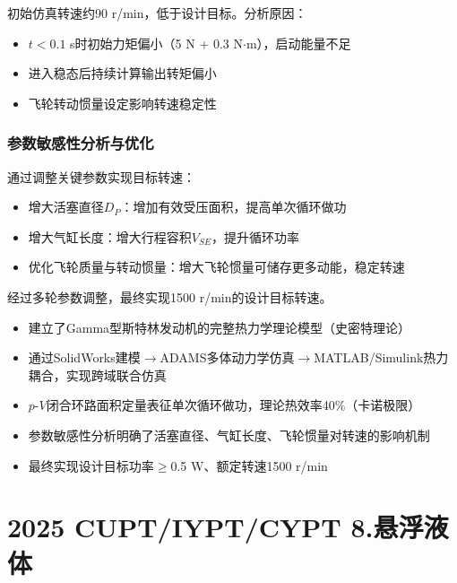 \documentclass[12pt,a4paper]{ctexart}
\begin{document}
初始仿真转速约90 r/min，低于设计目标。分析原因：

\begin{itemize}
    \item $t < 0.1$ s时初始力矩偏小（5 N + 0.3 N$\cdot$m），启动能量不足
    \item 进入稳态后持续计算输出转矩偏小
    \item 飞轮转动惯量设定影响转速稳定性
\end{itemize}

\subsubsection{参数敏感性分析与优化}

通过调整关键参数实现目标转速：

\begin{itemize}
    \item 增大活塞直径$D_P$：增加有效受压面积，提高单次循环做功
    \item 增大气缸长度：增大行程容积$V_{SE}$，提升循环功率
    \item 优化飞轮质量与转动惯量：增大飞轮惯量可储存更多动能，稳定转速
\end{itemize}

经过多轮参数调整，最终实现1500 r/min的设计目标转速。

\begin{resultbox}[项目成果]
\begin{itemize}
    \item 建立了Gamma型斯特林发动机的完整热力学理论模型（史密特理论）
    \item 通过SolidWorks建模$\to$ADAMS多体动力学仿真$\to$MATLAB/Simulink热力耦合，实现跨域联合仿真
    \item $p$-$V$闭合环路面积定量表征单次循环做功，理论热效率40\%（卡诺极限）
    \item 参数敏感性分析明确了活塞直径、气缸长度、飞轮惯量对转速的影响机制
    \item 最终实现设计目标功率$\geq$0.5 W、额定转速1500 r/min
\end{itemize}
\end{resultbox}

\newpage
\section{2025 CUPT/IYPT/CYPT 8.悬浮液体}
\end{document}

